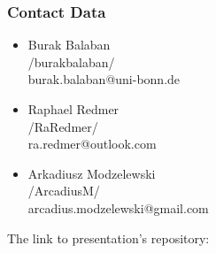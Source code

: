 \begin{frame}
    \frametitle{Contact Data}
    \begin{itemize}
        \item Burak Balaban\\
        \qquad \faGithub /burakbalaban/\\
        \qquad burak.balaban@uni-bonn.de
        \smallbreak
        \item Raphael Redmer\\
        \qquad \faGithub /RaRedmer/\\
        \qquad ra.redmer@outlook.com
        \smallbreak
        \item Arkadiusz Modzelewski\\
        \qquad \faGithub /ArcadiusM/\\
        \qquad arcadius.modzelewski@gmail.com
    \end{itemize}
    \bigbreak
    \bigbreak
    \quad The link to presentation's repository:\\
    \vspace{-1.5cm}
\end{frame}
    
